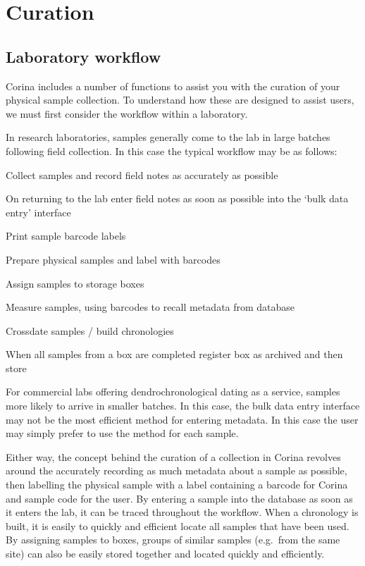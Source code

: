 \chapter{Curation}


\section{Laboratory workflow}
Corina includes a number of functions to assist you with the curation of your physical sample collection.  To understand how these are designed to assist users, we must first consider the workflow within a laboratory.

In research laboratories, samples generally come to the lab in large batches following field collection.   In this case the typical workflow may be as follows:

\begin{enumerate*}
 \item Collect samples and record field notes as accurately as possible
 \item On returning to the lab enter field notes as soon as possible into the `bulk data entry' interface
 \item Print sample barcode labels
 \item Prepare physical samples and label with barcodes
 \item Assign samples to storage boxes
 \item Measure samples, using barcodes to recall metadata from database
 \item Crossdate samples / build chronologies
 \item When all samples from a box are completed register box as archived and then store
\end{enumerate*}

For commercial labs offering dendrochronological dating as a service, samples more likely to arrive in smaller batches.  In this case, the bulk data entry interface may not be the most efficient method for entering metadata.  In this case the user may simply prefer to use the  method for each sample.  

Either way, the concept behind the curation of a collection in Corina revolves around the accurately recording as much metadata about a sample as possible, then labelling the physical sample with a label containing a barcode for Corina and sample code for the user.  By entering a sample into the database as soon as it enters the lab, it can be traced throughout the workflow.  When a chronology is built, it is easily to quickly and efficient locate all samples that have been used.  By assigning samples to boxes, groups of similar samples (e.g.\ from the same site) can also be easily stored together and located quickly and efficiently.  



